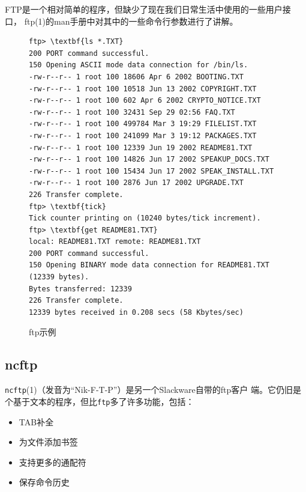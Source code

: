 FTP是一个相对简单的程序，但缺少了现在我们日常生活中使用的一些用户接口，
ftp(1)的man手册中对其中的一些命令行参数进行了讲解。
\begin{figure}[htpb]
  \centering
  
\begin{Verbatim}[frame=single, commandchars=\\\{\}]
ftp> \textbf{ls *.TXT}
200 PORT command successful.
150 Opening ASCII mode data connection for /bin/ls.
-rw-r--r-- 1 root 100 18606 Apr 6 2002 BOOTING.TXT
-rw-r--r-- 1 root 100 10518 Jun 13 2002 COPYRIGHT.TXT
-rw-r--r-- 1 root 100 602 Apr 6 2002 CRYPTO_NOTICE.TXT
-rw-r--r-- 1 root 100 32431 Sep 29 02:56 FAQ.TXT
-rw-r--r-- 1 root 100 499784 Mar 3 19:29 FILELIST.TXT
-rw-r--r-- 1 root 100 241099 Mar 3 19:12 PACKAGES.TXT
-rw-r--r-- 1 root 100 12339 Jun 19 2002 README81.TXT
-rw-r--r-- 1 root 100 14826 Jun 17 2002 SPEAKUP_DOCS.TXT
-rw-r--r-- 1 root 100 15434 Jun 17 2002 SPEAK_INSTALL.TXT
-rw-r--r-- 1 root 100 2876 Jun 17 2002 UPGRADE.TXT
226 Transfer complete.
ftp> \textbf{tick}
Tick counter printing on (10240 bytes/tick increment).
ftp> \textbf{get README81.TXT}
local: README81.TXT remote: README81.TXT
200 PORT command successful.
150 Opening BINARY mode data connection for README81.TXT (12339 bytes).
Bytes transferred: 12339
226 Transfer complete.
12339 bytes received in 0.208 secs (58 Kbytes/sec)
\end{Verbatim}
  \caption{ftp示例}
  \label{tab:ftp-examples}
\end{figure}

\subsection{ncftp}
\label{chap:basicNetworkCommands:ftp:ncftp}
\texttt{ncftp}(1)（发音为``Nik-F-T-P''）是另一个Slackware自带的ftp客户
端。它仍旧是个基于文本的程序，但比\texttt{ftp}多了许多功能，包括：
\begin{itemize}
\item TAB补全
\item 为文件添加书签
\item 支持更多的通配符
\item 保存命令历史
\end{itemize}


